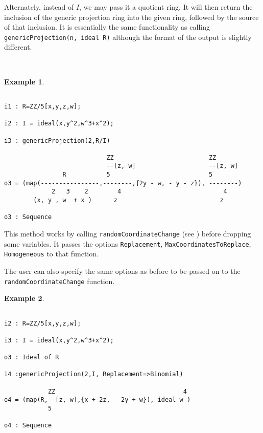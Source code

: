 \documentclass[11pt]{amsart}
\theoremstyle{definition}
\newtheorem{example}{Example}[section]
\begin{document}
Alternately, instead of {$I$}, we may pass it a quotient ring.  It will then return the inclusion of the generic projection ring into the given ring, followed by the source of that inclusion.  It is essentially the same functionality as calling {\tt genericProjection(n, ideal R)} although the format of the output is slightly different. 

~~

\begin{example}~~
	
	{{\small\color{blue}
	\begin{verbatim}

i1 : R=ZZ/5[x,y,z,w];

i2 : I = ideal(x,y^2,w^3+x^2);

i3 : genericProjection(2,R/I)	

                            ZZ                          ZZ
                            --[z, w]                    --[z, w]                        
                R           5                           5
o3 = (map(----------------,--------,{2y - w, - y - z}), --------)                       
             2   3    2        4                            4
        (x, y , w  + x )      z                            z

o3 : Sequence
	\end{verbatim}
	}}
\end{example}
	

This method works by calling {\tt randomCoordinateChange} (see ) before dropping some variables.  It passes the options {\tt Replacement}, {\tt MaxCoordinatesToReplace}, {\tt Homogeneous} to that function.

The user can also specify the same options as before to be passed on to the {\tt randomCoordinateChange} function.

\newpage

\begin{example}
	~~
	
	{{\small\color{blue}
	\begin{verbatim}
		
i2 : R=ZZ/5[x,y,z,w];

i3 : I = ideal(x,y^2,w^3+x^2);

o3 : Ideal of R

i4 :genericProjection(2,I, Replacement=>Binomial)

            ZZ                                   4
o4 = (map(R,--[z, w],{x + 2z, - 2y + w}), ideal w )                                     
            5

o4 : Sequence
\end{verbatim}
}}
\end{example}
\end{document}
